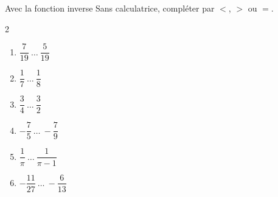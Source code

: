 \begin{exo}{Avec la fonction inverse}
	Sans calculatrice, compléter par $<$, $>$ ou $=$.
	\vspace*{-2mm}
	\begin{multicols}{2}
	\begin{enumerate}[itemsep=2mm]
		\item $\dfrac{7}{19} \ \dots \ \dfrac{5}{19}$
		\item $\dfrac{1}{7} \ \dots \ \dfrac{1}{8}$
		\item $\dfrac{3}{4} \ \dots \ \dfrac{3}{2}$
		\item $-\dfrac{7}{5} \ \dots \ -\dfrac{7}{9}$
		\item $\dfrac{1}{\pi} \ \dots \ \dfrac{1}{\pi - 1}$
		\item $-\dfrac{11}{27} \ \dots \ -\dfrac{6}{13}$
	\end{enumerate}
	\end{multicols}\vspace*{-2mm}
\end{exo}

